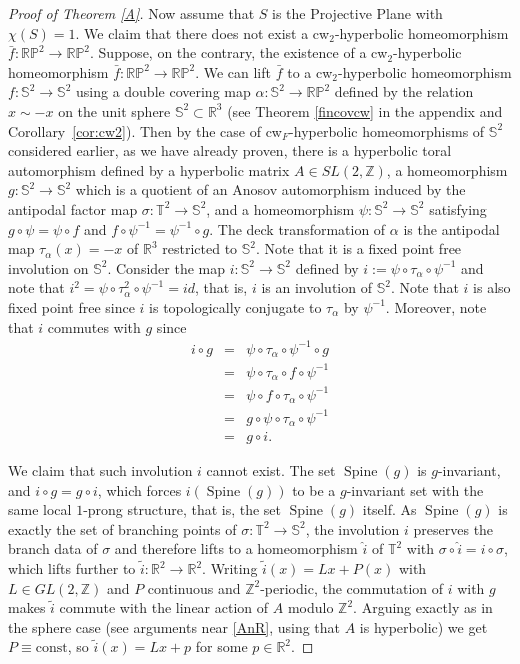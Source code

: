 \documentclass{amsart}
\theoremstyle{plain}
\theoremstyle{definition}
\newcommand{\spine}{\operatorname{Spine}}
\newcommand{\T}{\mathbb{T}}
\newcommand{\Z}{\mathbb{Z}}
\newcommand{\R}{\mathbb{R}}
\begin{document}
\begin{proof}[Proof of Theorem \ref{A}]
Now assume that $S$ is the Projective Plane with $\chi(S)=1$. 
We claim that there does not exist a cw$_2$-hyperbolic homeomorphism $\bar f\colon \mathbb{RP}^2\to \mathbb{RP}^2$. 
Suppose, on the contrary, the existence of a cw$_2$-hyperbolic homeomorphism $\bar f\colon \mathbb{RP}^2\to \mathbb{RP}^2$. We can lift $\bar f$ to a cw$_2$-hyperbolic homeomorphism $f\colon \mathbb{S}^2\to \mathbb{S}^2$ using a double covering map $\alpha\colon\mathbb{S}^2\to\mathbb{RP}^2$ defined by the relation $x\sim -x$ on the unit sphere $\mathbb{S}^2\subset \R^3$ (see Theorem \ref{fincovcw} in the appendix and Corollary~\ref{cor:cw2}). Then by the case of cw$_F$-hyperbolic homeomorphisms of $\mathbb{S}^2$ considered earlier, as we have already proven, there is a hyperbolic toral automorphism defined by a hyperbolic matrix $A\in SL(2,\Z)$, a homeomorphism $g\colon \mathbb{S}^2\to \mathbb{S}^2$ which is a quotient of an Anosov automorphism induced by the antipodal factor map $\sigma\colon \mathbb{T}^2\to \mathbb{S}^2$,
and a homeomorphism $\psi\colon \mathbb{S}^2\to \mathbb{S}^2$ satisfying $g\circ \psi=\psi\circ f$ and $f\circ \psi^{-1}=\psi^{-1}\circ g$. The deck transformation of $\alpha$ is the antipodal map $\tau_{\alpha}(x)=-x$ of $\R^3$ restricted to $\mathbb{S}^2$. Note that it is a fixed point free involution on $\mathbb{S}^2$.
Consider the map $i\colon\mathbb{S}^2\to\mathbb{S}^2$ defined by $i:=\psi\circ \tau_{\alpha}\circ \psi^{-1}$ and
note that $i^2=\psi\circ\tau_{\alpha}^2\circ\psi^{-1}=id$, that is, $i$ is an involution of $\mathbb{S}^2$. Note that $i$ is also fixed point free since $i$ is topologically conjugate to $\tau_{\alpha}$ by $\psi^{-1}$. Moreover, note that $i$ commutes with $g$ since
\begin{eqnarray*}
i\circ g&=&\psi\circ \tau_{\alpha}\circ \psi^{-1}\circ g\\
&=& \psi\circ \tau_{\alpha}\circ f\circ \psi^{-1} \\
&=&\psi\circ f\circ \tau_{\alpha}\circ \psi^{-1}\\
&=&  g\circ \psi\circ\tau_{\alpha}\circ \psi^{-1}\\
&=&g\circ i.
\end{eqnarray*}

We claim that such involution $i$ cannot exist. The set $\spine(g)$ is $g$-invariant, and $i\circ g=g \circ i$, which forces $i(\spine(g))$ to be a
$g$-invariant set with the same local $1$-prong structure, that is, the set $\spine(g)$ itself. As
$\spine(g)$ is exactly the set of branching points of $\sigma\colon\mathbb{T}^2\to\mathbb{S}^2$, the involution $i$
preserves the branch data of $\sigma$ and therefore lifts to a homeomorphism $\widehat i$ of
$\T^2$ with $\sigma\circ\widehat i=i\circ\sigma$, which lifts further to
$\widetilde i\colon\R^2\to\R^2$. Writing $\widetilde i(x)=Lx+P(x)$ with $L\in GL(2,\Z)$ and
$P$ continuous and $\Z^2$-periodic, the commutation of $i$ with $g$ makes $\widetilde i$
commute with the linear action of $A$ modulo $\Z^2$. Arguing exactly as in the sphere case
(see arguments near \eqref{AnR}, using that
$A$ is hyperbolic) we get $P\equiv\mathrm{const}$, so $\widetilde i(x)=Lx+p$ for some $p\in \R^2$.


\end{proof}
\end{document}
